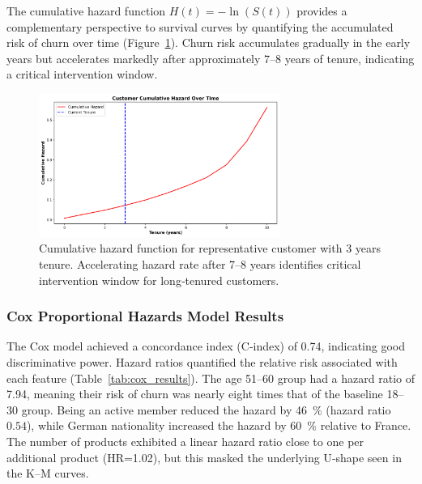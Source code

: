 \documentclass[12pt]{article}
\begin{document}
The cumulative hazard function \(H(t) = -\ln(S(t))\) provides a complementary perspective to survival curves by quantifying the accumulated risk of churn over time (Figure~\ref{fig:cumulative_hazard}). Churn risk accumulates gradually in the early years but accelerates markedly after approximately 7–8 years of tenure, indicating a critical intervention window.

\begin{figure}[H]
\centering
\includegraphics[width=0.7\textwidth]{img/cumulative_hazard_plot.png}
\caption{Cumulative hazard function for representative customer with 3 years tenure. Accelerating hazard rate after 7–8 years identifies critical intervention window for long‑tenured customers.}
\label{fig:cumulative_hazard}
\end{figure}

\subsubsection{Cox Proportional Hazards Model Results}
The Cox model achieved a concordance index (C‑index) of 0.74, indicating good discriminative power. Hazard ratios quantified the relative risk associated with each feature (Table~\ref{tab:cox_results}). The age 51–60 group had a hazard ratio of 7.94, meaning their risk of churn was nearly eight times that of the baseline 18–30 group. Being an active member reduced the hazard by 46~\% (hazard ratio \(0.54\)), while German nationality increased the hazard by 60~\% relative to France. The number of products exhibited a linear hazard ratio close to one per additional product (HR=1.02), but this masked the underlying U‑shape seen in the K–M curves.
\end{document}
